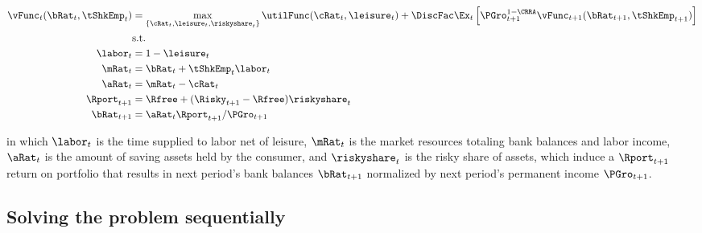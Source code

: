 \documentclass[\econtexRoot/SequentialEGM]{subfiles}
\begin{document}
\begin{equation}
        \begin{split}
                \vFunc_{t}(\bRat_{t}, \tShkEmp_{t}) & = \max_{\{\cRat_{t},
                        \leisure_{t}, \riskyshare_{t}\}} \utilFunc(\cRat_{t}, \leisure_{t}) +
                \DiscFac \Ex_{t} \left[ \PGro_{t+1}^{1-\CRRA}
                        \vFunc_{t+1} (\bRat_{t+1},
                        \tShkEmp_{t+1}) \right] \\
                & \text{s.t.} \\
                \labor_{t} & = 1 - \leisure_{t} \\
                \mRat_{t} & = \bRat_{t} + \tShkEmp_{t}\labor_{t} \\
                \aRat_{t} & = \mRat_{t} - \cRat_{t} \\
                \Rport_{t+1} & = \Rfree + (\Risky_{t+1} - \Rfree)
                \riskyshare_{t} \\
                \bRat_{t+1} & = \aRat_{t} \Rport_{t+1} / \PGro_{t+1}
        \end{split}
\end{equation}

in which $\labor_{t}$ is the time supplied to labor net of leisure, $\mRat_{t}$ is the market resources totaling bank balances and labor income, $\aRat_{t}$ is the amount of saving assets held by the consumer, and $\riskyshare_{t}$ is the risky share of assets, which induce a $\Rport_{t+1}$ return on portfolio that results in next period's bank balances $\bRat_{t+1}$ normalized by next period's permanent income $\PGro_{t+1}$.


\subsection{Solving the problem sequentially}
\end{document}
